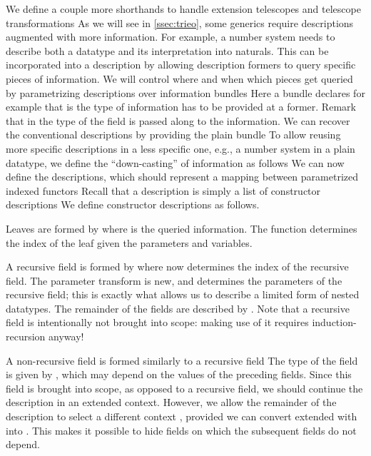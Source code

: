 We define a couple more shorthands to handle extension telescopes and telescope transformations
As we will see in \autoref{ssec:trieo}, some generics require descriptions augmented with more information. For example, a number system needs to describe both a datatype and its interpretation into naturals. This can be incorporated into a description by allowing description formers to query specific pieces of information. We will control where and when which pieces get queried by parametrizing descriptions over information bundles  
Here a bundle declares for example that  is the type of information has to be provided at a  former. Remark that in  the type of the field is passed along to the information. We can recover the conventional descriptions by providing the plain bundle
To allow reusing more specific descriptions in a less specific one, e.g., a number system in a plain datatype, we define the ``down-casting'' of information as follows
We can now define the descriptions, which should represent a mapping between parametrized indexed functors
Recall that a description is simply a list of constructor descriptions
We define constructor descriptions
as follows.

Leaves are formed by
where  is the queried information. The function  determines the index of the leaf given the parameters and variables.

A recursive field is formed by
where  now determines the index of the recursive field. The parameter transform  is new, and determines the parameters of the recursive field; this is exactly what allows us to describe a limited form of nested datatypes. The remainder of the fields are described by . Note that a recursive field is intentionally not brought into scope: making use of it requires induction-recursion anyway!

A non-recursive field is formed similarly to a recursive field
The type of the field is given by , which may depend on the values of the preceding fields. Since this field is brought into scope, as opposed to a recursive field, we should continue the description in an extended context. However, we allow the remainder of the description to select a different context , provided we can convert  extended with  into . This makes it possible to hide fields on which the subsequent fields do not depend.

